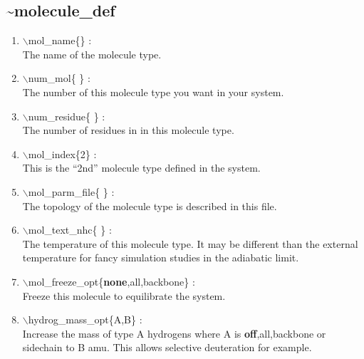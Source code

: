 \documentclass[12pt,titlepage]{article}
\begin{document}

\newpage
\subsection*{\bf \~{}molecule\_def}

\begin{enumerate}

 \vspace{0.15in} 
 \item  $\backslash$mol\_name\{\} : \\
   The name of the molecule type.

 \vspace{0.15in} 
 \item  $\backslash$num\_mol\{ \} : \\ 
   The number of this molecule type you want in your system.

 \vspace{0.15in} 
 \item  $\backslash$num\_residue\{ \} : \\
   The number of residues in in this molecule type.

 \vspace{0.15in} 
 \item  $\backslash$mol\_index\{2\} : \\ 
   This is the ``2nd'' molecule type defined in the system.

 \vspace{0.15in} 
 \item  $\backslash$mol\_parm\_file\{ \} : \\
   The topology of the molecule type is described in this file.

 \vspace{0.15in} 
 \item  $\backslash$mol\_text\_nhc\{ \} : \\
   The temperature of this molecule type. It may be different than the
   external temperature for fancy simulation studies in the adiabatic limit.

 \vspace{0.15in} 
 \item  $\backslash$mol\_freeze\_opt\{{\bf none},all,backbone\} : \\
    Freeze this molecule to equilibrate the system.

 \vspace{0.15in} 
 \item  $\backslash$hydrog\_mass\_opt\{A,B\} : \\
   Increase the mass of type A hydrogens where A is 
   {\bf off},all,backbone or sidechain to B amu. This allows
   selective deuteration for example.


\end{enumerate}
\end{document}
